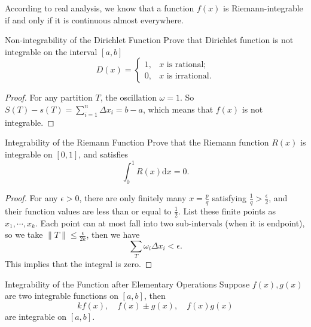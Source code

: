 \begin{note}
  According to real analysis, we know that a function $f(x)$ is
  Riemann-integrable if and only if it is continuous almost everywhere.
\end{note}

\begin{example}{Non-integrability of the Dirichlet Function}{}
  Prove that Dirichlet function is not integrable on the interval $[a, b]$
  \begin{equation}
    D(x) =
    \begin{cases}
      1, & x \text{ is rational};\\
      0, & x \text{ is irrational}.
    \end{cases}
  \end{equation}
\end{example}

\begin{proof}
  For any partition $T$,
  the oscillation $\omega = 1$.
  So $S(T) - s(T) = \sum\limits_{i = 1}^n \Delta x_i = b - a$,
  which means that $f(x)$ is not integrable.
\end{proof}

\begin{example}{Integrability of the Riemann Function}{}
  Prove that the Riemann function $R(x)$ is integrable on $[0, 1]$,
  and satisfies
  \begin{equation}
    \int_0^1 R(x) \mathrm{d} x = 0.
  \end{equation}
\end{example}

\begin{proof}
  For any $\epsilon > 0$, there are only finitely many $x = \frac{p}{q}$ satisfying
  $\frac{1}{q} > \frac{\epsilon}{2}$,
  and their function values are less than or equal to $\frac{1}{2}$.
  List these finite points as $x_1,\cdots,x_k$.
  Each point can at most fall into two sub-intervals (when it is endpoint),
  so we take $\|T\| \leq \frac{\epsilon}{2k}$,
  then we have
  \begin{equation}
    \sum _T \omega_i \Delta x_i < \epsilon.
  \end{equation}
  This implies that the integral is zero.
\end{proof}

\begin{proposition}{Integrability of the Function after Elementary Operations}{}
  Suppose $f(x), g(x)$ are two integrable functions on $[a, b]$,
  then 
  \begin{equation}
    kf(x), \quad f(x) \pm g(x), \quad f(x)g(x)
  \end{equation}
  are integrable on $[a, b]$.
\end{proposition}

